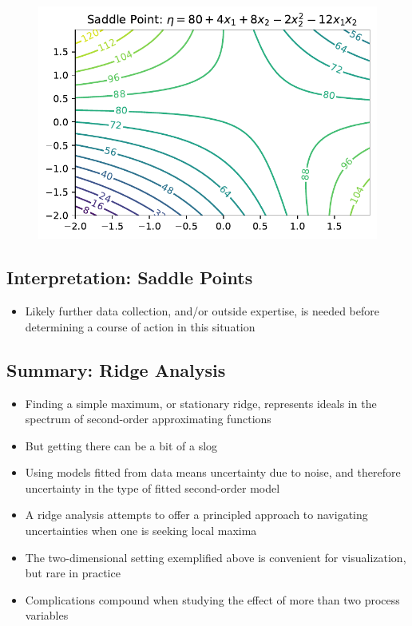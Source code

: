 \documentclass[
  letterpaper,
  DIV=11,
  numbers=noendperiod]{scrreprt}
\providecommand{\tightlist}{%
  \setlength{\itemsep}{0pt}\setlength{\parskip}{0pt}}\usepackage{longtable,booktabs,array}
\begin{document}
\begin{figure}[H]

{\centering \includegraphics{005_num_rsm_files/figure-pdf/cell-15-output-2.pdf}

}

\end{figure}

\hypertarget{interpretation-saddle-points}{%
\subsection{Interpretation: Saddle
Points}\label{interpretation-saddle-points}}

\begin{itemize}
\tightlist
\item
  Likely further data collection, and/or outside expertise, is needed
  before determining a course of action in this situation
\end{itemize}

\hypertarget{summary-ridge-analysis}{%
\subsection{Summary: Ridge Analysis}\label{summary-ridge-analysis}}

\begin{itemize}
\tightlist
\item
  Finding a simple maximum, or stationary ridge, represents ideals in
  the spectrum of second-order approximating functions
\item
  But getting there can be a bit of a slog
\item
  Using models fitted from data means uncertainty due to noise, and
  therefore uncertainty in the type of fitted second-order model
\item
  A ridge analysis attempts to offer a principled approach to navigating
  uncertainties when one is seeking local maxima
\item
  The two-dimensional setting exemplified above is convenient for
  visualization, but rare in practice
\item
  Complications compound when studying the effect of more than two
  process variables
\end{itemize}
\end{document}
